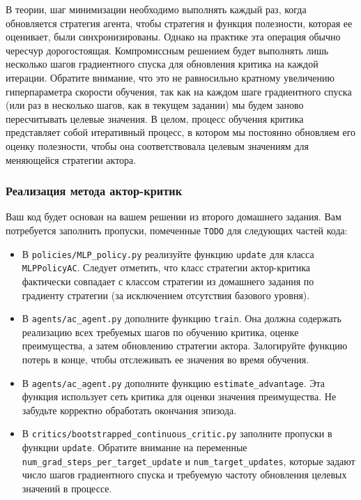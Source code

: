 \documentclass[12pt, oneside]{article}
\begin{document}
В теории, шаг минимизации необходимо выполнять каждый раз, когда обновляется стратегия агента, чтобы стратегия и функция полезности, которая ее оценивает, были синхронизированы. Однако на практике эта операция обычно чересчур дорогостоящая. Компромиссным решением будет выполнять лишь несколько шагов градиентного спуска для обновления критика на каждой итерации. Обратите внимание, что это не равносильно кратному увеличению гиперпараметра скорости обучения, так как на каждом шаге градиентного спуска (или раз в несколько шагов, как в текущем задании) мы будем заново пересчитывать целевые значения. В целом, процесс обучения критика представляет собой итеративный процесс, в котором мы постоянно обновляем его оценку полезности, чтобы она соответствовала целевым значениям для меняющейся стратегии актора.

\subsubsection{Реализация метода актор-критик}

Ваш код будет основан на вашем решении из второго домашнего задания. Вам потребуется заполнить пропуски, помеченные \verb|TODO| для следующих частей кода:

\begin{itemize}
    \item В \verb|policies/MLP_policy.py| реализуйте функцию \verb|update| для класса \verb|MLPPolicyAC|. Следует отметить, что класс стратегии актор-критика фактически совпадает с классом стратегии из домашнего задания по градиенту стратегии (за исключением отсутствия базового уровня).
    \item В \verb|agents/ac_agent.py| дополните функцию \verb|train|. Она должна содержать реализацию всех требуемых шагов по обучению критика, оценке преимущества, а затем обновлению стратегии актора. Залогируйте функцию потерь в конце, чтобы отслеживать ее значения во время обучения.
    \item В \verb|agents/ac_agent.py| дополните функцию \verb|estimate_advantage|. Эта функция использует сеть критика для оценки значения преимущества. Не забудьте корректно обработать окончания эпизода.
    \item В \verb|critics/bootstrapped_continuous_critic.py| заполните пропуски в функции \verb|update|. Обратите внимание на переменные 
    \verb|num_grad_steps_per_target_update| и \verb|num_target_updates|, которые задают число шагов градиентного спуска и требуемую частоту обновления целевых значений в процессе.
\end{itemize}
\end{document}
